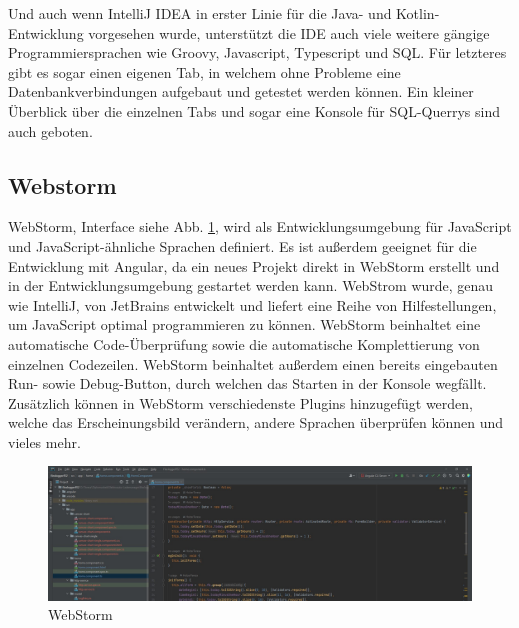 Und auch wenn IntelliJ IDEA in erster Linie für die Java- und Kotlin-Entwicklung vorgesehen wurde, unterstützt die IDE auch viele weitere gängige Programmiersprachen wie Groovy, Javascript, Typescript und SQL. Für letzteres gibt es sogar einen eigenen Tab, in welchem ohne Probleme eine Datenbankverbindungen aufgebaut und getestet werden können. Ein kleiner Überblick über die einzelnen Tabs und sogar eine Konsole für SQL-Querrys sind auch geboten.


\cite{IntellijJetbrains}





\subsection{Webstorm} 
WebStorm, Interface siehe Abb. \ref{fig:impl:webstorm}, wird als Entwicklungsumgebung für JavaScript und JavaScript-ähnliche Sprachen definiert. Es ist außerdem geeignet für die Entwicklung mit Angular, da ein neues Projekt direkt in WebStorm erstellt und in der Entwicklungsumgebung gestartet werden kann. WebStrom wurde, genau wie IntelliJ, von JetBrains entwickelt und liefert eine Reihe von Hilfestellungen, um JavaScript optimal programmieren zu können. WebStorm beinhaltet eine automatische Code-Überprüfung sowie die automatische Komplettierung von einzelnen Codezeilen. WebStorm beinhaltet außerdem einen bereits eingebauten Run- sowie Debug-Button, durch welchen das Starten in der Konsole wegfällt. Zusätzlich können in WebStorm verschiedenste Plugins hinzugefügt werden, welche das Erscheinungsbild verändern, andere Sprachen überprüfen können und vieles mehr. \cite{webstormOfficialSite}


\begin{figure}[h t]
\centering
\includegraphics[scale=0.38]{pics/webstorm.jpg}
\caption{WebStorm}
\label{fig:impl:webstorm}
\end{figure}



